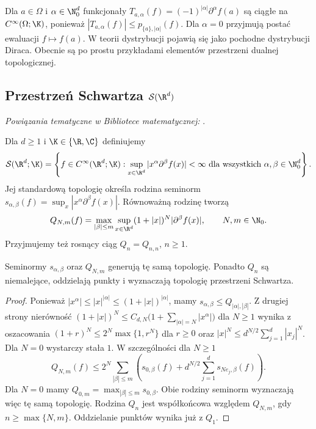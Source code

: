 \begin{przyklad}
\label{ex:evaluation-cinf17}
Dla $a\in\Omega$ i $\alpha\in\N_0^d$ funkcjonały
$T_{a,\alpha}(f)=(-1)^{|\alpha|}\partial^\alpha f(a)$
są ciągłe na $C^\infty(\Omega;\K)$, ponieważ
$|T_{a,\alpha}(f)|\le p_{\{a\},|\alpha|}(f)$.
Dla $\alpha=0$
przyjmują postać ewaluacji $f\mapsto f(a)$.
W teorii dystrybucji pojawią się jako pochodne
dystrybucji Diraca. Obecnie są po prostu przykładami
elementów przestrzeni dualnej topologicznej.
\end{przyklad}

\subsection{Przestrzeń Schwartza \texorpdfstring{$\mathcal S(\R^d)$}{S(Rd)}}

\noindent\emph{Powiązania tematyczne w Bibliotece matematycznej:} .


\begin{definicja}
\label{def:schwartz17}
Dla $d\ge1$ i $\K\in\{\R,\C\}$ definiujemy
\[
\mathcal S(\R^d;\K)=\left\{f\in C^\infty(\R^d;\K):
\sup_{x\in\R^d}|x^\alpha\partial^\beta f(x)|<\infty
\ \text{dla wszystkich }\alpha,\beta\in\N_0^d\right\}.
\]
Jej standardową topologię określa rodzina seminorm
$s_{\alpha,\beta}(f)=\sup_x|x^\alpha\partial^\beta f(x)|$.
Równoważną rodzinę tworzą
\[
 Q_{N,m}(f)=\max_{|\beta|\le m}\sup_{x\in\R^d}
 (1+|x|)^N|\partial^\beta f(x)|,
 \qquad N,m\in\N_0.
\]
Przyjmujemy też rosnący ciąg $Q_n=Q_{n,n}$, $n\ge1$.
\end{definicja}

\begin{lemat}
\label{lem:schwartz-seminorms17}
Seminormy $s_{\alpha,\beta}$ oraz $Q_{N,m}$ generują tę samą
topologię. Ponadto $Q_n$ są niemalejące, oddzielają punkty
i wyznaczają topologię przestrzeni Schwartza.
\end{lemat}
\begin{proof}
Ponieważ $|x^\alpha|\le |x|^{|\alpha|}\le(1+|x|)^{|\alpha|}$,
mamy $s_{\alpha,\beta}\le Q_{|\alpha|,|\beta|}$.
Z drugiej strony nierówność
$(1+|x|)^N\le C_{d,N}\bigl(1+\sum_{|\alpha|=N}|x^\alpha|\bigr)$
dla $N\ge1$ wynika z oszacowania
$(1+r)^N\le 2^N\max\{1,r^N\}$ dla $r\ge0$ oraz
$|x|^N\le d^{N/2}\sum_{j=1}^d|x_j|^N$.
Dla $N=0$ wystarczy stała $1$. W szczególności dla $N\ge1$
\[
Q_{N,m}(f)\le 2^N\sum_{|\beta|\le m}
\left(s_{0,\beta}(f)+d^{N/2}\sum_{j=1}^d s_{Ne_j,\beta}(f)\right).
\]
Dla $N=0$ mamy $Q_{0,m}=\max_{|\beta|\le m}s_{0,\beta}$.
Obie rodziny seminorm wyznaczają więc tę samą topologię.
Rodzina $Q_n$ jest współkońcowa względem $Q_{N,m}$,
gdy $n\ge\max\{N,m\}$. Oddzielanie punktów wynika już z $Q_1$.
\end{proof}

